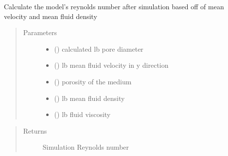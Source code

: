 \documentclass[letterpaper,10pt,english]{sphinxmanual}
\begin{document}
\begin{fulllineitems}
\label{\detokenize{index:lb_colloids.LB.LB_2Dpermeability.get_reynolds_number}}
Calculate the model’s reynolds number after simulation
based off of mean velocity and mean fluid density
\begin{quote}\begin{description}
\item[{Parameters}] \leavevmode\begin{itemize}
\item {} 
 () \textendash{} calculated lb pore diameter

\item {} 
 () \textendash{} lb mean fluid velocity in y direction

\item {} 
 () \textendash{} porosity of the medium

\item {} 
 () \textendash{} lb mean fluid density

\item {} 
 () \textendash{} lb fluid viscosity

\end{itemize}

\end{description}\end{quote}
\begin{quote}\begin{description}
\item[{Returns}] \leavevmode
Simulation Reynolds number

\end{description}\end{quote}

\end{fulllineitems}

\end{document}
